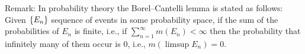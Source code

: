 \documentclass{../homework}
\begin{document}
\begin{problems}
  Remark: In probability theory the Borel--Cantelli lemma is stated as
  follows: Given \(\{E_n\}\) sequence of events in some probability
  space, if the sum of the probabilities of \(E_n\) is finite, i.e.,
  if \(\sum_{n=1}^\infty m(E_n) < \infty\) then the probability that
  infinitely many of them occur is
  \(0\), i.e., \(m(\limsup E_n) = 0\).

  \begin{solution}
    \begin{problems}
    \item
    \item
    \end{problems}
  \end{solution}

\end{problems}
\end{document}
